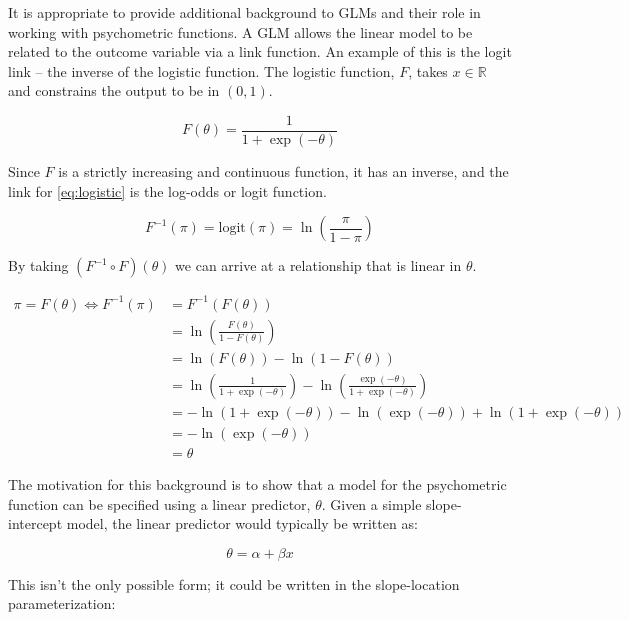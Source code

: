 \documentclass[11pt, oneside, openany]{scrbook}
\begin{document}
It is appropriate to provide additional background to GLMs and their role in working with psychometric functions. A GLM allows the linear model to be related to the outcome variable via a link function. An example of this is the logit link -- the inverse of the logistic function. The logistic function, \(F\), takes \(x \in \mathbb{R}\) and constrains the output to be in \((0, 1)\).

\begin{equation}
  F(\theta) = \frac{1}{1 + \exp\left(-\theta\right)}
  \label{eq:logistic}
\end{equation}

Since \(F\) is a strictly increasing and continuous function, it has an inverse, and the link for \eqref{eq:logistic} is the log-odds or logit function.

\begin{equation}
  F^{-1}(\pi) = \mathrm{logit}(\pi) = \ln\left(\frac{\pi}{1 - \pi}\right)
  \label{eq:logit}
\end{equation}

By taking \((F^{-1} \circ F)(\theta)\) we can arrive at a relationship that is linear in \(\theta\).


\begin{align*}
  \pi = F(\theta) \Longleftrightarrow F^{-1}(\pi) &= F^{-1}(F(\theta)) \\
  & = \ln\left(\frac{F(\theta)}{1 - F(\theta)}\right) \\
  &= \ln(F(\theta)) - \ln(1 - F(\theta)) \\
  &= \ln\left(\frac{1}{1 + \exp(-\theta)}\right) - \ln\left(\frac{\exp(-\theta)}{1 + \exp(-\theta)}\right) \\
  &= - \ln(1 + \exp(-\theta)) - \ln(\exp(-\theta)) + \ln(1 + \exp(-\theta)) \\
  &= - \ln(\exp(-\theta)) \\
  &= \theta
\end{align*}

The motivation for this background is to show that a model for the psychometric function can be specified using a linear predictor, \(\theta\). Given a simple slope-intercept model, the linear predictor would typically be written as:

\begin{equation}
  \theta = \alpha + \beta x
  \label{eq:linearform1}
\end{equation}

This isn't the only possible form; it could be written in the slope-location parameterization:
\end{document}
